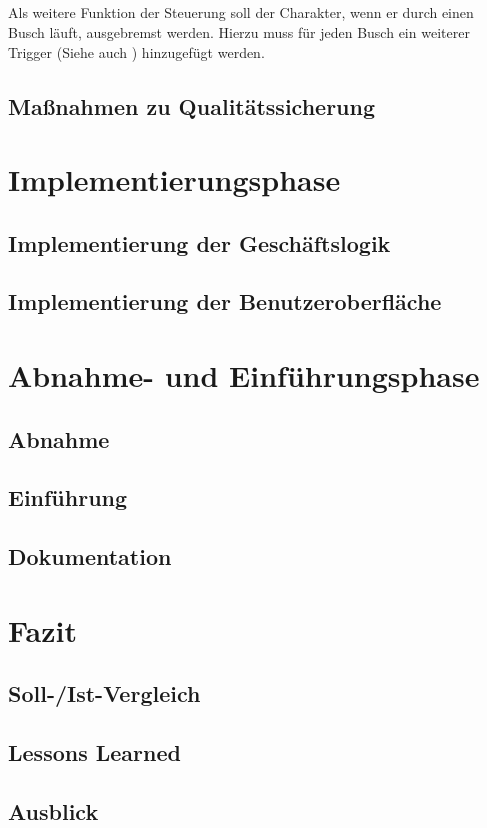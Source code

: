 \paragraph{}
Als weitere Funktion der Steuerung soll der Charakter, wenn er durch einen Busch läuft, ausgebremst werden. Hierzu muss für jeden Busch ein weiterer Trigger (Siehe auch ) hinzugefügt werden.

\section{Maßnahmen zu Qualitätssicherung}
\paragraph{}


\chapter{Implementierungsphase}
\section{Implementierung der Geschäftslogik}
\paragraph{}


\section{Implementierung der Benutzeroberfläche}
\paragraph{}

\chapter{Abnahme- und Einführungsphase}

\section{Abnahme}
\section{Einführung}
\section{Dokumentation}

\chapter{Fazit}
\section{Soll-/Ist-Vergleich}
\section{Lessons Learned}
\section{Ausblick}
